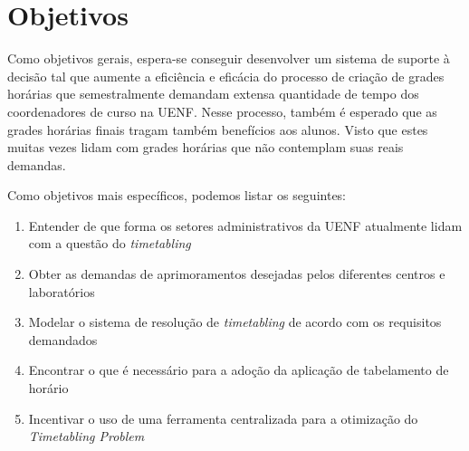 \chapter{Objetivos}

Como objetivos gerais, espera-se conseguir desenvolver um sistema de suporte à decisão tal que aumente a eficiência e eficácia do processo de criação de grades horárias que semestralmente demandam extensa quantidade de tempo dos coordenadores de curso na UENF. Nesse processo, também é esperado que as grades horárias finais tragam também benefícios aos alunos. Visto que estes muitas vezes lidam com grades horárias que não contemplam suas reais demandas.

Como objetivos mais específicos, podemos listar os seguintes:

\begin{enumerate}
    \item Entender de que forma os setores administrativos da UENF atualmente lidam com a questão do \textit{timetabling}
    \item Obter as demandas de aprimoramentos desejadas pelos diferentes centros e laboratórios
    \item Modelar o sistema de resolução de \textit{timetabling} de acordo com os requisitos demandados
    \item Encontrar o que é necessário para a adoção da aplicação de tabelamento de horário
    \item Incentivar o uso de uma ferramenta centralizada para a otimização do \textit{Timetabling Problem}
\end{enumerate}
